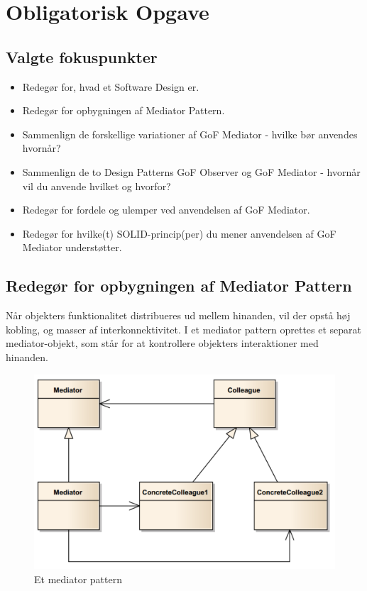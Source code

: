 \section{Obligatorisk Opgave}

\subsection{Valgte fokuspunkter}

\begin{itemize}
	\item Redegør for, hvad et Software Design er.
	\item Redegør for opbygningen af Mediator Pattern.
	\item Sammenlign de forskellige variationer af GoF Mediator - hvilke bør anvendes hvornår?
	\item Sammenlign de to Design Patterns GoF Observer og GoF Mediator - hvornår vil du anvende hvilket og hvorfor?
	\item Redegør for fordele og ulemper ved anvendelsen af GoF Mediator.
	\item Redegør for hvilke(t) SOLID-princip(per) du mener anvendelsen af GoF Mediator understøtter.
\end{itemize}



\subsection{Redegør for opbygningen af Mediator Pattern}
Når objekters funktionalitet distribueres ud mellem hinanden, vil der opstå høj kobling, og masser
af interkonnektivitet. I et mediator pattern oprettes et separat mediator-objekt, som står for at
kontrollere objekters interaktioner med hinanden.

\begin{figure}[H]
\centering
\includegraphics[width=0.7\linewidth]{figs/mediator/mediatorPattern.PNG}
\caption{Et mediator pattern}
\label{fig:mediatorPattern}
\end{figure}

